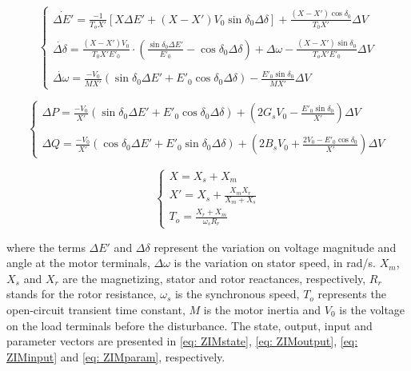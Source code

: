\begin{equation}
    \begin{cases}
        \dot{\Delta E'} = \frac{-1}{T_{o}X'}[X\Delta E' + (X - X')V_{0}\sin\delta_{0}\Delta \delta] + \frac{(X - X')\cos\delta_{0}}{T_{0}X'}\Delta V \\
        \\
        \dot{\Delta \delta} = \frac{(X-X')V_{0}}{T_{0}X'E'_{0}}\cdot\left(\frac{\sin\delta_{0}\Delta E'}{E'_0} - \cos\delta_{0}\Delta\delta\right) + \Delta\omega - \frac{(X - X')\sin\delta_0}{T_o X'E'_0}\Delta V \\
        \\
        \dot{\Delta \omega} = \frac{-V_{0}}{MX'}(\sin\delta_{0}\Delta E' + E'_{0}\cos\delta_{0}\Delta\delta) - \frac{E'_0\sin\delta_0}{MX'}\Delta V
    \end{cases}
    \label{eq: xZIM}
\end{equation}

\begin{equation}
    \begin{cases}
        \Delta P = \frac{-V_{0}}{X'}(\sin{\delta_{0}}\Delta E' + E'_{0}\cos{\delta_{0}}\Delta \delta) + \left(2G_{s} V_{0} - \frac{E'_{0} \sin{\delta_{0}}}{X'}\right)\Delta V \\
        \\
        \Delta Q = \frac{-V_{0}}{X'}(\cos{\delta_{0}}\Delta E' + E'_{0}\sin{\delta_{0}}\Delta\delta) + \left(2B_{s} V_{0} + \frac{2V_{0} - E'_{0} \cos{\delta_{0}}}{X'}\right)\Delta V
    \end{cases}
    \label{eq: yZIM}
\end{equation}

\begin{equation}
    \begin{cases}
    X = X_{s} + X_{m} \\
    X' = X_{s} + \frac{X_{m} X_{r}}{X_{m} + X_{s}} \\
    T_{o} = \frac{X_{r} + X_{m}}{\omega_{s} R_{r}}
    \end{cases}
    \label{eq: terms}
\end{equation}

\noindent where the terms $\Delta E'$ and $\Delta \delta$ represent the variation on voltage magnitude and angle at the motor terminals, $\Delta \omega$ is the variation on stator speed, in rad/s. $X_m$, $X_s$ and $X_r$ are the magnetizing, stator and rotor reactances, respectively, $R_r$ stands for the rotor resistance, $\omega_{s}$ is the synchronous speed, $T_o$ represents the open-circuit transient time constant, $M$ is the motor inertia and $V_{0}$ is the voltage on the load terminals before the disturbance. The state, output, input and parameter vectors are presented in \eqref{eq: ZIMstate}, \eqref{eq: ZIMoutput}, \eqref{eq: ZIMinput} and \eqref{eq: ZIMparam}, respectively.

